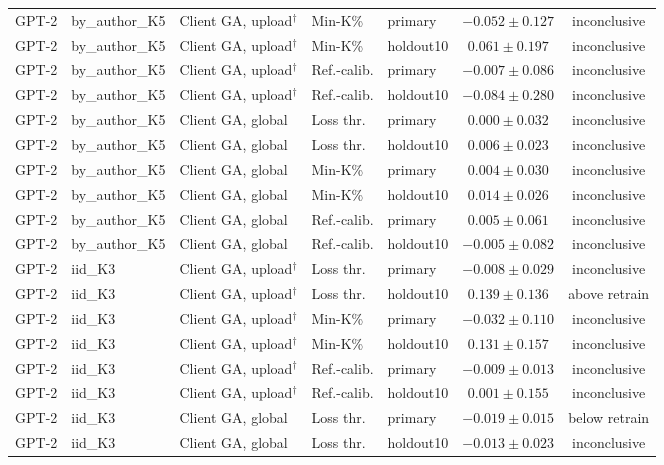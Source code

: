 \begin{table}[t]
\begin{tabular*}{\textwidth}{@{\extracolsep{\fill}}lllllcc@{}}
GPT-2 & by\_author\_K5 & Client GA, upload$^{\dagger}$ & Min-K\% & primary & $-0.052 \pm 0.127$ & inconclusive \\
GPT-2 & by\_author\_K5 & Client GA, upload$^{\dagger}$ & Min-K\% & holdout10 & $0.061 \pm 0.197$ & inconclusive \\
GPT-2 & by\_author\_K5 & Client GA, upload$^{\dagger}$ & Ref.-calib. & primary & $-0.007 \pm 0.086$ & inconclusive \\
GPT-2 & by\_author\_K5 & Client GA, upload$^{\dagger}$ & Ref.-calib. & holdout10 & $-0.084 \pm 0.280$ & inconclusive \\
GPT-2 & by\_author\_K5 & Client GA, global & Loss thr. & primary & $0.000 \pm 0.032$ & inconclusive \\
GPT-2 & by\_author\_K5 & Client GA, global & Loss thr. & holdout10 & $0.006 \pm 0.023$ & inconclusive \\
GPT-2 & by\_author\_K5 & Client GA, global & Min-K\% & primary & $0.004 \pm 0.030$ & inconclusive \\
GPT-2 & by\_author\_K5 & Client GA, global & Min-K\% & holdout10 & $0.014 \pm 0.026$ & inconclusive \\
GPT-2 & by\_author\_K5 & Client GA, global & Ref.-calib. & primary & $0.005 \pm 0.061$ & inconclusive \\
GPT-2 & by\_author\_K5 & Client GA, global & Ref.-calib. & holdout10 & $-0.005 \pm 0.082$ & inconclusive \\
GPT-2 & iid\_K3 & Client GA, upload$^{\dagger}$ & Loss thr. & primary & $-0.008 \pm 0.029$ & inconclusive \\
GPT-2 & iid\_K3 & Client GA, upload$^{\dagger}$ & Loss thr. & holdout10 & $0.139 \pm 0.136$ & above retrain \\
GPT-2 & iid\_K3 & Client GA, upload$^{\dagger}$ & Min-K\% & primary & $-0.032 \pm 0.110$ & inconclusive \\
GPT-2 & iid\_K3 & Client GA, upload$^{\dagger}$ & Min-K\% & holdout10 & $0.131 \pm 0.157$ & inconclusive \\
GPT-2 & iid\_K3 & Client GA, upload$^{\dagger}$ & Ref.-calib. & primary & $-0.009 \pm 0.013$ & inconclusive \\
GPT-2 & iid\_K3 & Client GA, upload$^{\dagger}$ & Ref.-calib. & holdout10 & $0.001 \pm 0.155$ & inconclusive \\
GPT-2 & iid\_K3 & Client GA, global & Loss thr. & primary & $-0.019 \pm 0.015$ & below retrain \\
GPT-2 & iid\_K3 & Client GA, global & Loss thr. & holdout10 & $-0.013 \pm 0.023$ & inconclusive \\

\end{tabular*}
\end{table}
